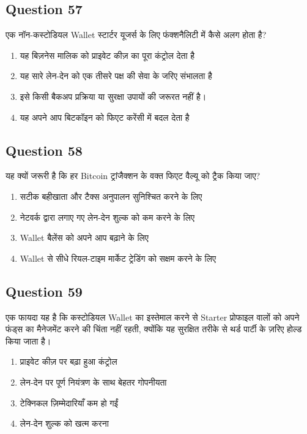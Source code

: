\documentclass[12pt,a4paper]{article}
\begin{document}
\bigskip


\subsection*{Question 57}
एक नॉन-कस्टोडियल Wallet स्टार्टर यूजर्स के लिए फंक्शनैलिटी में कैसे अलग होता है?

\begin{enumerate}[label=\Alph*., leftmargin=*]
\item यह बिज़नेस मालिक को प्राइवेट कीज़ का पूरा कंट्रोल देता है
\item यह सारे लेन-देन को एक तीसरे पक्ष की सेवा के जरिए संभालता है
\item इसे किसी बैकअप प्रक्रिया या सुरक्षा उपायों की जरूरत नहीं है।
\item यह अपने आप बिटकॉइन को फिएट करेंसी में बदल देता है
\end{enumerate}

\bigskip


\subsection*{Question 58}
यह क्यों जरूरी है कि हर Bitcoin ट्रांजैक्शन के वक्त फिएट वैल्यू को ट्रैक किया जाए?

\begin{enumerate}[label=\Alph*., leftmargin=*]
\item सटीक बहीखाता और टैक्स अनुपालन सुनिश्चित करने के लिए
\item नेटवर्क द्वारा लगाए गए लेन-देन शुल्क को कम करने के लिए
\item Wallet बैलेंस को अपने आप बढ़ाने के लिए
\item Wallet से सीधे रियल-टाइम मार्केट ट्रेडिंग को सक्षम करने के लिए
\end{enumerate}

\bigskip


\subsection*{Question 59}
एक फायदा यह है कि कस्टोडियल Wallet का इस्तेमाल करने से Starter प्रोफाइल वालों को अपने फंड्स का मैनेजमेंट करने की चिंता नहीं रहती, क्योंकि यह सुरक्षित तरीके से थर्ड पार्टी के ज़रिए होल्ड किया जाता है।

\begin{enumerate}[label=\Alph*., leftmargin=*]
\item प्राइवेट कीज़ पर बढ़ा हुआ कंट्रोल
\item लेन-देन पर पूर्ण नियंत्रण के साथ बेहतर गोपनीयता
\item टेक्निकल ज़िम्मेदारियाँ कम हो गईं
\item लेन-देन शुल्क को खत्म करना
\end{enumerate}
\end{document}

